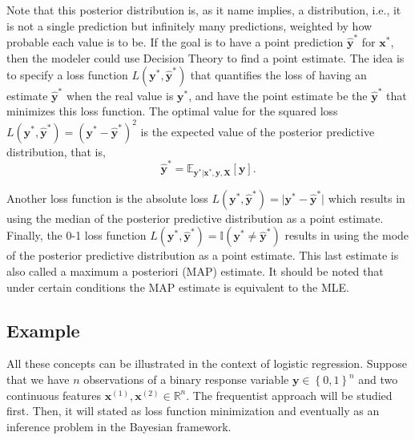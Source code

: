Note that this posterior distribution is, as it name implies, a distribution, i.e., it is not a single prediction but infinitely many predictions, weighted by how probable each value is to be.
If the goal is to have a point prediction $\hat{\boldsymbol{y}}^*$ for $\boldsymbol{x}^*$, then the modeler could use Decision Theory to find a point estimate. The idea is to specify a loss function $L(\boldsymbol{y}^*, \hat{\boldsymbol{y}}^*)$ that quantifies the loss of having an estimate $\hat{\boldsymbol{y}}^*$ when the real value is $\boldsymbol{y}^*$, and have the point estimate be the $\hat{\boldsymbol{y}}^*$ that minimizes this loss function.
The optimal value for the squared loss $L(\boldsymbol{y}^*, \hat{\boldsymbol{y}}^*) = (\boldsymbol{y}^* - \hat{\boldsymbol{y}}^*)^2$ is the expected value of the posterior predictive distribution, that is,
\begin{equation}
  \hat{\boldsymbol{y}}^* = \mathbb{E}_{\boldsymbol{y}^* | \boldsymbol{x}^*, \boldsymbol{y}, \boldsymbol{X}} \left[ \boldsymbol{y} \right].
\end{equation}

Another loss function is the absolute loss $L(\boldsymbol{y}^*, \hat{\boldsymbol{y}}^*) = \vert \boldsymbol{y}^* - \hat{\boldsymbol{y}}^* \vert$ which results in using the median of the posterior predictive distribution as a point estimate. Finally, the 0-1 loss function $L(\boldsymbol{y}^*, \hat{\boldsymbol{y}}^*) = \mathbb{I}(\boldsymbol{y}^* \neq \hat{\boldsymbol{y}}^* )$ results in using the mode of the posterior predictive distribution as a point estimate. This last estimate is also called a maximum a posteriori (MAP) estimate. It should be noted that under certain conditions the MAP estimate is equivalent to the MLE.

\subsection{Example}

All these concepts can be illustrated in the context of logistic regression. Suppose that we have $n$ observations of a binary response variable $\boldsymbol{y} \in \left\{0, 1\right\}^n$ and two continuous features $\boldsymbol{x}^{(1)}, \boldsymbol{x}^{(2)} \in \mathbb{R}^n$. The frequentist approach will be studied first.
Then, it will stated as loss function minimization and eventually as an inference problem in the Bayesian framework.

